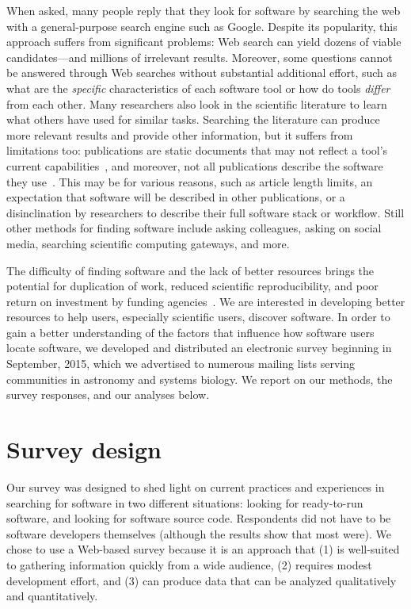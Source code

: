 \documentclass{casicswhitepaper}
\begin{document}
When asked, many people reply that they look for software by searching the web with a general-purpose search engine such as Google.  Despite its popularity, this approach suffers from significant problems: Web search can yield dozens of viable candidates---and millions of irrelevant results.  Moreover, some questions cannot be answered through Web searches without substantial additional effort, such as what are the \emph{specific} characteristics of each software tool or how do tools \emph{differ} from each other.  Many researchers also look in the scientific literature to learn what others have used for similar tasks.  Searching the literature can produce more relevant results and provide other information, but it suffers from limitations too: publications are static documents that may not reflect a tool's current capabilities~\cite{wren_2004}, and moreover, not all publications describe the software they use~\cite{howison2015software}.  This may be for various reasons, such as article length limits, an expectation that software will be described in other publications, or a disinclination by researchers to describe their full software stack or workflow.  Still other methods for finding software include asking colleagues, asking on social media, searching scientific computing gateways, and more.

The difficulty of finding software and the lack of better resources brings the potential for duplication of work, reduced scientific reproducibility, and poor return on investment by funding agencies~\citep{cannata_2005, national2003sharing, crook2013learning, poisot2015best}.  We are interested in developing better resources to help users, especially scientific users, discover software.  In order to gain a better understanding of the factors that influence how software users locate software, we developed and distributed an electronic survey beginning in September, 2015, which we advertised to numerous mailing lists serving communities in astronomy and systems biology.  We report on our methods, the survey responses, and our analyses below.


\section{Survey design}

Our survey was designed to shed light on current practices and experiences in searching for software in two different situations: looking for ready-to-run software, and looking for software source code.  Respondents did not have to be software developers themselves (although the results show that most were).  We chose to use a Web-based survey because it is an approach that (1) is well-suited to gathering information quickly from a wide audience, (2) requires modest development effort, and (3) can produce data that can be analyzed qualitatively and quantitatively.
\end{document}
